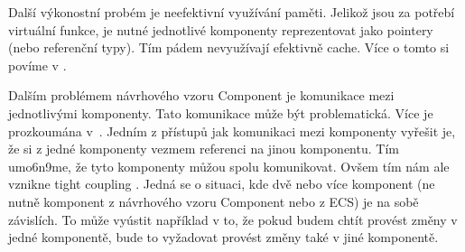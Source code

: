 Další výkonostní probém je neefektivní využívání paměti. Jelikož jsou za potřebí virtuální funkce, je nutné jednotlivé komponenty reprezentovat jako pointery (nebo referenční typy). Tím pádem nevyužívají efektivně cache. Více o tomto si povíme v .

Dalším problémem návrhového vzoru Component je komunikace mezi jednotlivými komponenty. Tato komunikace může být problematická. Více je prozkoumána v~\citet{nystrom2014game}. Jedním z přístupů jak komunikaci mezi komponenty vyřešit je, že si z jedné komponenty vezmem referenci na jinou komponentu. Tím umo6n9me, že tyto komponenty můžou spolu komunikovat. Ovšem tím nám ale vznikne tight coupling . Jedná se o situaci, kde dvě nebo více komponent (ne nutně komponent z návrhového vzoru Component nebo z ECS) je na sobě závislích. To může vyústit například v to, že pokud budem chtít provést změny v jedné komponentě, bude to vyžadovat provést změny také v jiné komponentě.